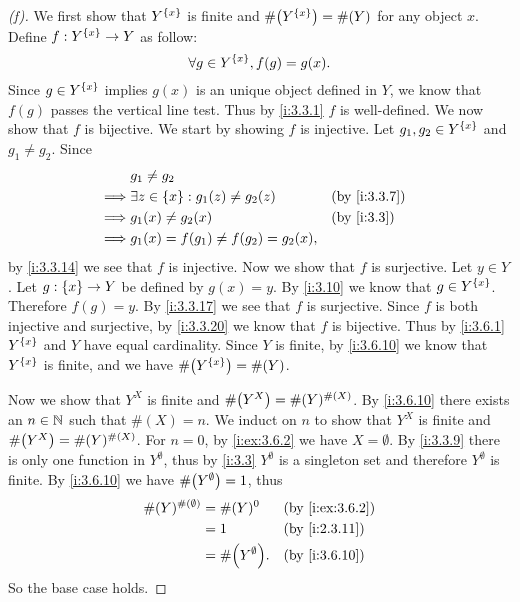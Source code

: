 \begin{proof}[(f)]
  We first show that \(Y^{\left\lbrace x\right\rbrace}\) is finite and \(\#\pa{Y^{\set{x}}} = \#(Y)\) for any object \(x\).
  Define \(f : Y^{\left\lbrace x\right\rbrace} \to Y\) as follow:
  \[
    \forall g \in Y^{\left\lbrace x\right\rbrace}, f(g) = g(x).
  \]
  Since \(g \in Y^{\left\lbrace x\right\rbrace}\) implies \(g(x)\) is an unique object defined in \(Y\), we know that \(f(g)\) passes the vertical line test.
  Thus by \cref{i:3.3.1} \(f\) is well-defined.
  We now show that \(f\) is bijective.
  We start by showing \(f\) is injective.
  Let \(g_1, g_2 \in Y^{\left\lbrace x\right\rbrace}\) and \(g_1 \neq g_2\).
  Since
  \begin{align*}
             & g_1 \neq g_2                                                 \\
    \implies & \exists z \in \set{x} : g_1(z) \neq g_2(z) &  & \by{i:3.3.7} \\
    \implies & g_1(x) \neq g_2(x)                         &  & \by{i:3.3}   \\
    \implies & g_1(x) = f(g_1) \neq f(g_2) = g_2(x),
  \end{align*}
  by \cref{i:3.3.14} we see that \(f\) is injective.
  Now we show that \(f\) is surjective.
  Let \(y \in Y\).
  Let \(g : \left\lbrace x\right\rbrace \to Y\) be defined by \(g(x) = y\).
  By \cref{i:3.10} we know that \(g \in Y^{\left\lbrace x\right\rbrace}\).
  Therefore \(f(g) = y\).
  By \cref{i:3.3.17} we see that \(f\) is surjective.
  Since \(f\) is both injective and surjective, by \cref{i:3.3.20} we know that \(f\) is bijective.
  Thus by \cref{i:3.6.1} \(Y^{\left\lbrace x\right\rbrace}\) and \(Y\) have equal cardinality.
  Since \(Y\) is finite, by \cref{i:3.6.10} we know that \(Y^{\left\lbrace x\right\rbrace}\) is finite, and we have \(\#\pa{Y^{\set{x}}} = \#(Y)\).

  Now we show that \(Y^X\) is finite and \(\#\pa{Y^X} = \#(Y)^{\#(X)}\).
  By \cref{i:3.6.10} there exists an \(n \in \mathbb{N}\) such that \(\#(X) = n\).
  We induct on \(n\) to show that \(Y^X\) is finite and \(\#\pa{Y^X} = \#(Y)^{\#(X)}\).
  For \(n = 0\), by \cref{i:ex:3.6.2} we have \(X = \emptyset\).
  By \cref{i:3.3.9} there is only one function in \(Y^\emptyset\), thus by \cref{i:3.3} \(Y^\emptyset\) is a singleton set and therefore \(Y^\emptyset\) is finite.
  By \cref{i:3.6.10} we have \(\#\pa{Y^\emptyset} = 1\), thus
  \begin{align*}
    \#(Y)^{\#(\emptyset)} & = \#(Y)^0             &  & \by{i:ex:3.6.2} \\
                          & = 1                   &  & \by{i:2.3.11}   \\
                          & = \#\pa{Y^\emptyset}. &  & \by{i:3.6.10}
  \end{align*}
  So the base case holds.


\end{proof}
